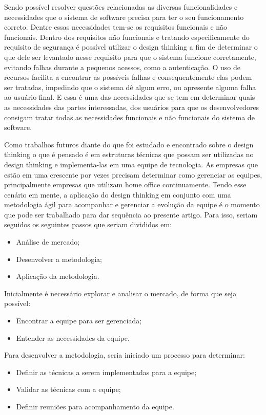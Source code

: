 \documentclass[a4paper,twoside]{article}
\begin{document}
Sendo possível resolver questões relacionadas as diversas funcionalidades e necessidades que o sistema de software precisa para ter o seu funcionamento correto. Dentre essas necessidades tem-se os requisitos funcionais e não funcionais.
Dentro dos requisitos não funcionais e tratando especificamente do requisito de segurança é possível utilizar o design thinking a fim de determinar o que dele ser levantado nesse requisito para que o sistema funcione corretamente, evitando falhas durante a pequenos acessos, como a autenticação.
O uso de recursos facilita a encontrar as possíveis falhas e consequentemente elas podem ser tratadas, impedindo que o sistema dê algum erro, ou apresente alguma falha ao usuário final. E essa é uma das necessidades que se tem em determinar quais as necessidades das partes interessadas, dos usuários para que os desenvolvedores consigam tratar todas as necessidades funcionais e não funcionais do sistema de software.

Como trabalhos futuros diante do que foi estudado e encontrado sobre o design thinking o que é pensado é em estruturas técnicas que possam ser utilizadas no design thinking e implementa-las em uma equipe de tecnologia. As empresas que estão em uma crescente por vezes precisam determinar como gerenciar as equipes, principalmente empresas que utilizam home office continuamente. Tendo esse cenário em mente, a aplicação do design thinking em conjunto com uma metodologia ágil para acompanhar e gerenciar a evolução da equipe é o momento que pode ser trabalhado para dar sequência ao presente artigo. Para isso, seriam seguidos os seguintes passos que seriam divididos em:
\begin{itemize}
    \item Análise de mercado;
    \item Desenvolver a metodologia;
    \item Aplicação da metodologia.
\end{itemize}

Inicialmente é necessário explorar e analisar o mercado, de forma que seja possível:
\begin{itemize}
    \item Encontrar a equipe para ser gerenciada;
    \item Entender as necessidades da equipe.
\end{itemize}

Para desenvolver a metodologia, seria iniciado um processo para determinar:
\begin{itemize}
    \item Definir as técnicas a serem implementadas para a equipe;
    \item Validar as técnicas com a equipe;
    \item Definir reuniões para acompanhamento da equipe.
\end{itemize}
\end{document}
